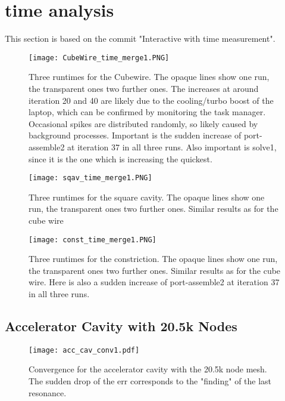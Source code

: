 




\section{time analysis}
This section is based on the commit "Interactive with time measurement".

\begin{figure}[h]
	\centering
	\texttt{[image: CubeWire\_time\_merge1.PNG]}
	\caption{Three runtimes for the Cubewire. The opaque lines show one run, the transparent ones two further ones. The increases at around iteration 20 and 40 are likely due to the cooling/turbo boost of the laptop, which can be confirmed by monitoring the task manager. Occasional spikes are distributed randomly, so likely caused by background processes. Important is the sudden increase of port-assemble2 at iteration 37 in all three runs. Also important is solve1, since it is the one which is increasing the quickest.}
	\label{}
\end{figure}


\begin{figure}[h]
	\centering
	\texttt{[image: sqav\_time\_merge1.PNG]}
	\caption{Three runtimes for the square cavity. The opaque lines show one run, the transparent ones two further ones. Similar results as for the cube wire}
	\label{}
\end{figure}



\begin{figure}[h]
	\centering
	\texttt{[image: const\_time\_merge1.PNG]}
	\caption{Three runtimes for the constriction. The opaque lines show one run, the transparent ones two further ones. Similar results as for the cube wire. Here is also a sudden increase of port-assemble2 at iteration 37 in all three runs.}
	\label{}
\end{figure}

\subsection{Accelerator Cavity with 20.5k Nodes}
\begin{figure}[h]
	\centering
	\texttt{[image: acc\_cav\_conv1.pdf]}
	\caption{Convergence for the accelerator cavity with the 20.5k node mesh. The sudden drop of the err corresponds to the "finding" of the last resonance.}
	\label{ }
\end{figure}

